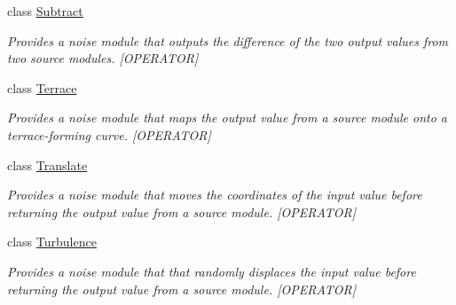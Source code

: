 \begin{DoxyCompactItemize}
class \hyperlink{class_lib_noise_1_1_operator_1_1_subtract}{Subtract}
\begin{DoxyCompactList}\small\item\em Provides a noise module that outputs the difference of the two output values from two source modules. \mbox{[}O\+P\+E\+R\+A\+T\+OR\mbox{]} \end{DoxyCompactList}\item 
class \hyperlink{class_lib_noise_1_1_operator_1_1_terrace}{Terrace}
\begin{DoxyCompactList}\small\item\em Provides a noise module that maps the output value from a source module onto a terrace-\/forming curve. \mbox{[}O\+P\+E\+R\+A\+T\+OR\mbox{]} \end{DoxyCompactList}\item 
class \hyperlink{class_lib_noise_1_1_operator_1_1_translate}{Translate}
\begin{DoxyCompactList}\small\item\em Provides a noise module that moves the coordinates of the input value before returning the output value from a source module. \mbox{[}O\+P\+E\+R\+A\+T\+OR\mbox{]} \end{DoxyCompactList}\item 
class \hyperlink{class_lib_noise_1_1_operator_1_1_turbulence}{Turbulence}
\begin{DoxyCompactList}\small\item\em Provides a noise module that that randomly displaces the input value before returning the output value from a source module. \mbox{[}O\+P\+E\+R\+A\+T\+OR\mbox{]} \end{DoxyCompactList}\end{DoxyCompactItemize}
